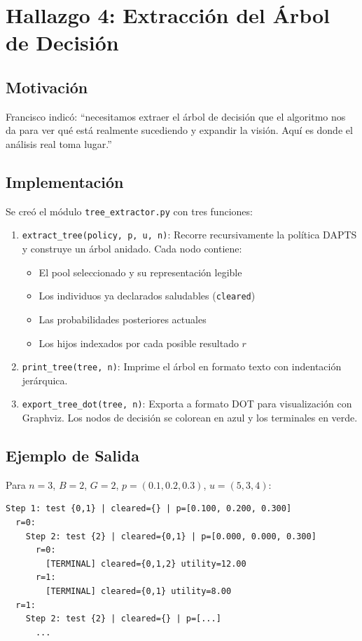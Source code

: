 \documentclass[11pt, a4paper]{article}
\begin{document}
\section{Hallazgo 4: Extracci\'on del \'Arbol de Decisi\'on}

\subsection{Motivaci\'on}
Francisco indic\'o: ``necesitamos extraer el \'arbol de decisi\'on que el
algoritmo nos da para ver qu\'e est\'a realmente sucediendo y expandir la
visi\'on. Aqu\'i es donde el an\'alisis real toma lugar.''

\subsection{Implementaci\'on}
Se cre\'o el m\'odulo \texttt{tree\_extractor.py} con tres funciones:

\begin{enumerate}[nosep]
    \item \texttt{extract\_tree(policy, p, u, n)}: Recorre recursivamente la
    pol\'itica DAPTS y construye un \'arbol anidado. Cada nodo contiene:
    \begin{itemize}[nosep]
        \item El pool seleccionado y su representaci\'on legible
        \item Los individuos ya declarados saludables (\texttt{cleared})
        \item Las probabilidades posteriores actuales
        \item Los hijos indexados por cada posible resultado $r$
    \end{itemize}

    \item \texttt{print\_tree(tree, n)}: Imprime el \'arbol en formato texto
    con indentaci\'on jer\'arquica.

    \item \texttt{export\_tree\_dot(tree, n)}: Exporta a formato DOT para
    visualizaci\'on con Graphviz. Los nodos de decisi\'on se colorean en azul
    y los terminales en verde.
\end{enumerate}

\subsection{Ejemplo de Salida}
Para $n=3$, $B=2$, $G=2$, $p=(0.1, 0.2, 0.3)$, $u=(5, 3, 4)$:
\begin{verbatim}
Step 1: test {0,1} | cleared={} | p=[0.100, 0.200, 0.300]
  r=0:
    Step 2: test {2} | cleared={0,1} | p=[0.000, 0.000, 0.300]
      r=0:
        [TERMINAL] cleared={0,1,2} utility=12.00
      r=1:
        [TERMINAL] cleared={0,1} utility=8.00
  r=1:
    Step 2: test {2} | cleared={} | p=[...]
      ...
\end{verbatim}
\end{document}
